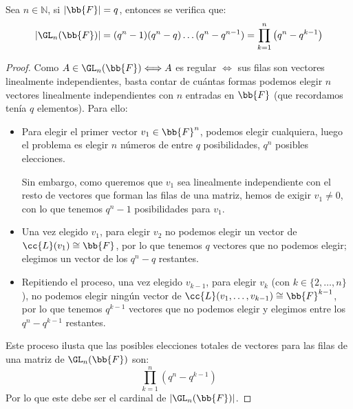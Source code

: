\begin{prop}
    Sea $n\in \mathbb{N}$, si $|\bb{F}| = q$, entonces se verifica que:
    \begin{equation*}
        |\GL_n(\bb{F})| = (q^n-1)(q^n -q)\ldots (q^n - q^{n-1}) = \prod_{k=1}^{n}\left(q^n - q^{k-1}\right)
    \end{equation*}
    \begin{proof}
        Como $A\in \GL_n(\bb{F})\Longleftrightarrow A$ es regular $\Longleftrightarrow $ sus filas son vectores linealmente independientes, basta contar de cuántas formas podemos elegir $n$ vectores linealmente independientes con $n$ entradas en $\bb{F}$ (que recordamos tenía $q$ elementos). Para ello:
        \begin{itemize}
            \item Para elegir el primer vector $v_1\in \bb{F}^n$, podemos elegir cualquiera, luego el problema es elegir $n$ números de entre $q$ posibilidades, $q^n$ posibles elecciones.
                
                Sin embargo, como queremos que $v_1$ sea linealmente independiente con el resto de vectores que forman las filas de una matriz, hemos de exigir $v_1\neq 0$, con lo que tenemos $q^n-1$ posibilidades para $v_1$.
            \item Una vez elegido $v_1$, para elegir $v_2$ no podemos elegir un vector de $\cc{L}(v_1)\cong \bb{F}$, por lo que tenemos $q$ vectores que no podemos elegir; elegimos un vector de los $q^n-q$ restantes.
            \item Repitiendo el proceso, una vez elegido $v_{k-1}$, para elegir $v_k$ (con $k \in \{2, \ldots, n\}$), no podemos elegir ningún vector de $\cc{L}(v_1,\ldots,v_{k-1})\cong\bb{F}^{k-1}$, por lo que tenemos $q^{k-1}$ vectores que no podemos elegir y elegimos entre los $q^n-q^{k-1}$ restantes.
        \end{itemize}
        Este proceso ilusta que las posibles elecciones totales de vectores para las filas de una matriz de $\GL_n(\bb{F})$ son:
        \begin{equation*}
            \prod_{k=1}^{n}\left(q^n-q^{k-1}\right)
        \end{equation*}
        Por lo que este debe ser el cardinal de $|\GL_n(\bb{F})|$.
    \end{proof}
\end{prop}

